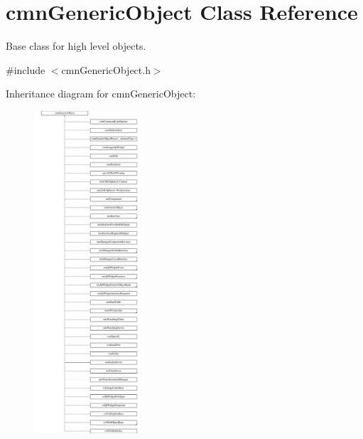 \hypertarget{classcmn_generic_object}{}\section{cmn\+Generic\+Object Class Reference}
\label{classcmn_generic_object}


Base class for high level objects.  




{\ttfamily \#include $<$cmn\+Generic\+Object.\+h$>$}

Inheritance diagram for cmn\+Generic\+Object\+:\begin{figure}[H]
\begin{center}
\leavevmode
\includegraphics[height=12.000000cm]{d0/d24/classcmn_generic_object}
\end{center}
\end{figure}
